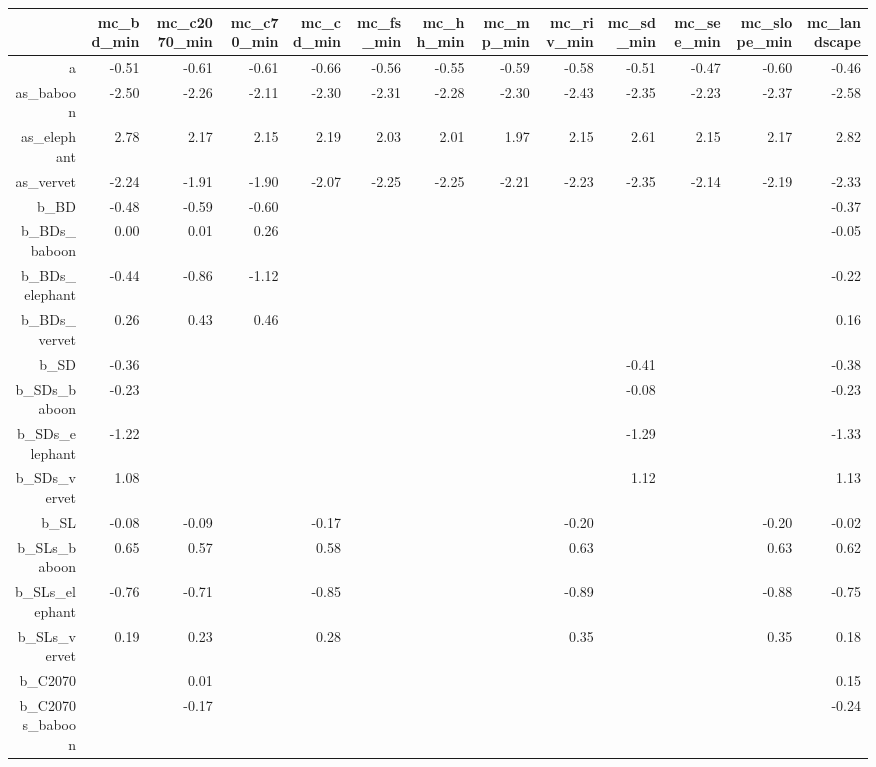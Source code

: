 \begin{table}[ht]
\centering
\begin{tabular}{rrrrrrrrrrrrr}
  \hline
 & mc\_bd\_min & mc\_c2070\_min & mc\_c70\_min & mc\_cd\_min & mc\_fs\_min & mc\_hh\_min & mc\_mp\_min & mc\_riv\_min & mc\_sd\_min & mc\_see\_min & mc\_slope\_min & mc\_landscape \\ 
  \hline
a & -0.51 & -0.61 & -0.61 & -0.66 & -0.56 & -0.55 & -0.59 & -0.58 & -0.51 & -0.47 & -0.60 & -0.46 \\ 
  as\_baboon & -2.50 & -2.26 & -2.11 & -2.30 & -2.31 & -2.28 & -2.30 & -2.43 & -2.35 & -2.23 & -2.37 & -2.58 \\ 
  as\_elephant & 2.78 & 2.17 & 2.15 & 2.19 & 2.03 & 2.01 & 1.97 & 2.15 & 2.61 & 2.15 & 2.17 & 2.82 \\ 
  as\_vervet & -2.24 & -1.91 & -1.90 & -2.07 & -2.25 & -2.25 & -2.21 & -2.23 & -2.35 & -2.14 & -2.19 & -2.33 \\ 
  b\_BD & -0.48 & -0.59 & -0.60 &  &  &  &  &  &  &  &  & -0.37 \\ 
  b\_BDs\_baboon & 0.00 & 0.01 & 0.26 &  &  &  &  &  &  &  &  & -0.05 \\ 
  b\_BDs\_elephant & -0.44 & -0.86 & -1.12 &  &  &  &  &  &  &  &  & -0.22 \\ 
  b\_BDs\_vervet & 0.26 & 0.43 & 0.46 &  &  &  &  &  &  &  &  & 0.16 \\ 
  b\_SD & -0.36 &  &  &  &  &  &  &  & -0.41 &  &  & -0.38 \\ 
  b\_SDs\_baboon & -0.23 &  &  &  &  &  &  &  & -0.08 &  &  & -0.23 \\ 
  b\_SDs\_elephant & -1.22 &  &  &  &  &  &  &  & -1.29 &  &  & -1.33 \\ 
  b\_SDs\_vervet & 1.08 &  &  &  &  &  &  &  & 1.12 &  &  & 1.13 \\ 
  b\_SL & -0.08 & -0.09 &  & -0.17 &  &  &  & -0.20 &  &  & -0.20 & -0.02 \\ 
  b\_SLs\_baboon & 0.65 & 0.57 &  & 0.58 &  &  &  & 0.63 &  &  & 0.63 & 0.62 \\ 
  b\_SLs\_elephant & -0.76 & -0.71 &  & -0.85 &  &  &  & -0.89 &  &  & -0.88 & -0.75 \\ 
  b\_SLs\_vervet & 0.19 & 0.23 &  & 0.28 &  &  &  & 0.35 &  &  & 0.35 & 0.18 \\ 
  b\_C2070 &  & 0.01 &  &  &  &  &  &  &  &  &  & 0.15 \\ 
  b\_C2070s\_baboon &  & -0.17 &  &  &  &  &  &  &  &  &  & -0.24 \\ 

\end{tabular}
\end{table}
